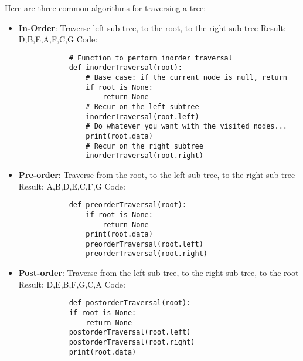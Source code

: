 \documentclass[12pt]{article}
\begin{document}
Here are three common algorithms for traversing a tree:
\begin{itemize}
	\item \textbf{In-Order}: Traverse left sub-tree, to the root, to the right sub-tree
		\subitem Result: D,B,E,A,F,C,G
		\subitem Code:
		\begin{lstlisting}
			# Function to perform inorder traversal
			def inorderTraversal(root):
				# Base case: if the current node is null, return
				if root is None:
					return None
				# Recur on the left subtree
				inorderTraversal(root.left)
				# Do whatever you want with the visited nodes...
				print(root.data)
				# Recur on the right subtree
				inorderTraversal(root.right)
		\end{lstlisting}
	\item \textbf{Pre-order}: Traverse from the root, to the left sub-tree, to the right sub-tree
		\subitem Result: A,B,D,E,C,F,G
		\subitem Code:
		\begin{lstlisting}
			def preorderTraversal(root):
				if root is None:
					return None
				print(root.data)
				preorderTraversal(root.left)
				preorderTraversal(root.right)
		\end{lstlisting}
	\item \textbf{Post-order}: Traverse from the left sub-tree, to the right sub-tree, to the root
		\subitem Result: D,E,B,F,G,C,A
		\subitem Code:
		\begin{lstlisting}			
			def postorderTraversal(root):
			if root is None:
				return None			
			postorderTraversal(root.left)
			postorderTraversal(root.right)
			print(root.data)
		\end{lstlisting}
\end{itemize}

%
%
\end{document}
